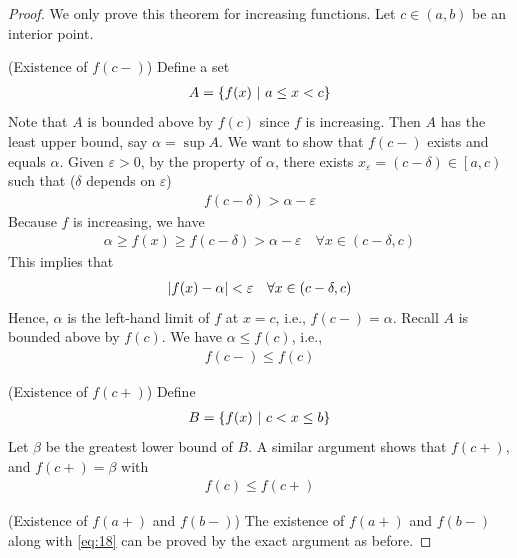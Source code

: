 \documentclass[thmcnt=section, 12pt]{my-elegantbook}
\begin{document}
\begin{proof}
    We only prove this theorem for increasing functions. Let $c \in (a, b)$ be an interior point. 
    
    \par (Existence of $f(c-)$) Define a set 
    \begin{align*}
        A = \left\{ f(x) \ \middle| \ a \leq x < c \right\}
    \end{align*}
    Note that $A$ is bounded above by $f(c)$ since $f$ is increasing. Then $A$ has the least upper bound, say $\alpha = \sup A$. We want to show that $f(c-)$ exists and equals $\alpha$. Given $\varepsilon > 0$, by the property of $\alpha$, there exists $x_\varepsilon = (c - \delta) \in \left[ a, c \right) $ such that ($\delta$ depends on $\varepsilon$)
    \begin{align*}
        f(c - \delta) > \alpha - \varepsilon
    \end{align*}
    Because $f$ is increasing, we have 
    \begin{align*}
        \alpha \geq f(x) \geq f(c-\delta) > \alpha-\varepsilon
        \quad \forall x \in (c-\delta, c)
    \end{align*}
    This implies that 
    \begin{align*}
        \left\lvert f(x) - \alpha \right\rvert < \varepsilon
        \quad \forall x \in (c-\delta, c)
    \end{align*}
    Hence, $\alpha$ is the left-hand limit of $f$ at $x = c$, i.e., $f(c-) = \alpha$. Recall $A$ is bounded above by $f(c)$. We have $\alpha \leq f(c)$, i.e., 
    \begin{align*}
        f(c-) \leq f(c)
    \end{align*}

    \par (Existence of $f(c+)$) Define 
    \begin{align*}
        B = \left\{ f(x) \ \middle| \ c < x \leq b \right\}
    \end{align*}
    Let $\beta$ be the greatest lower bound of $B$. A similar argument shows that $f(c+)$, and $f(c+) = \beta$ with 
    \begin{align*}
        f(c) \leq f(c+)
    \end{align*}

    \par (Existence of $f(a+)$ and $f(b-)$) The existence of $f(a+)$ and $f(b-)$ along with \eqref{eq:18} can be proved by the exact argument as before.
\end{proof}

\end{document}
